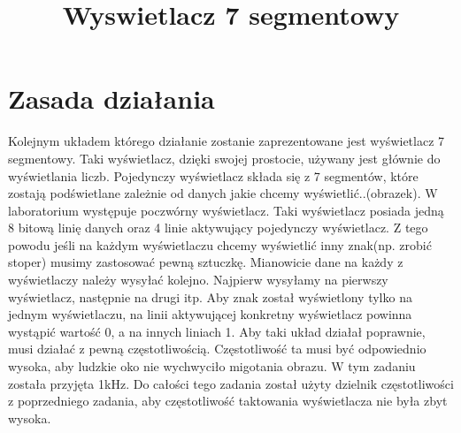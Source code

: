\documentclass{article}
\title{Wyswietlacz 7 segmentowy}
\begin{document}
\maketitle
\section{Zasada działania}
Kolejnym układem którego działanie zostanie zaprezentowane jest wyświetlacz 7 segmentowy. Taki wyświetlacz, dzięki swojej prostocie, używany jest głównie do wyświetlania liczb. Pojedynczy wyświetlacz składa się z 7 segmentów, które zostają podświetlane zależnie od danych jakie chcemy wyświetlić..(obrazek). W laboratorium występuje  poczwórny wyświetlacz. Taki wyświetlacz posiada jedną 8 bitową linię danych oraz 4 linie aktywujący pojedynczy wyświetlacz. Z tego powodu jeśli na każdym wyświetlaczu chcemy wyświetlić inny znak(np. zrobić stoper) musimy zastosować pewną sztuczkę. Mianowicie dane na każdy z wyświetlaczy należy wysyłać kolejno. Najpierw wysyłamy na pierwszy wyświetlacz, następnie na drugi itp. Aby znak został wyświetlony tylko na jednym wyświetlaczu, na linii aktywującej konkretny wyświetlacz powinna wystąpić wartość 0, a na innych liniach 1. Aby taki układ działał poprawnie, musi działać z pewną częstotliwością. Częstotliwość ta musi być odpowiednio wysoka, aby ludzkie oko nie wychwyciło migotania obrazu. W tym zadaniu została przyjęta 1kHz. Do całości tego zadania został użyty dzielnik częstotliwości z poprzedniego zadania, aby częstotliwość taktowania wyświetlacza nie była zbyt wysoka. 
\end{document}
